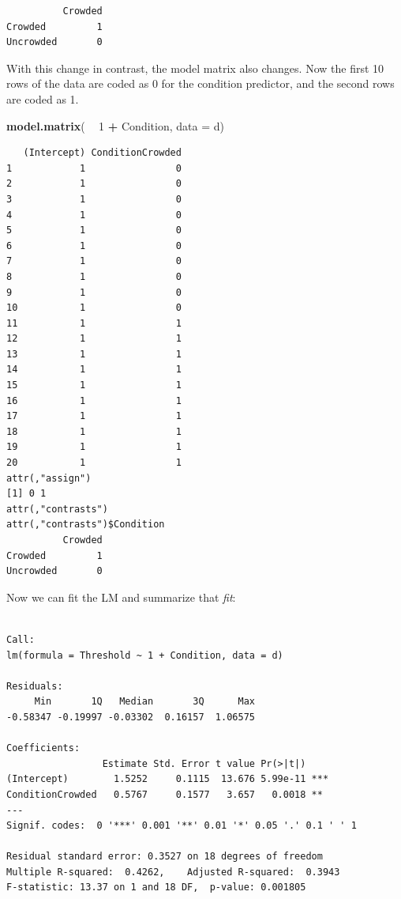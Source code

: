 \documentclass[
]{article}
\newenvironment{Shaded}{\begin{snugshade}}{\end{snugshade}}
\newcommand{\DataTypeTok}[1]{\textcolor[rgb]{0.13,0.29,0.53}{#1}}
\newcommand{\DecValTok}[1]{\textcolor[rgb]{0.00,0.00,0.81}{#1}}
\newcommand{\KeywordTok}[1]{\textcolor[rgb]{0.13,0.29,0.53}{\textbf{#1}}}
\newcommand{\NormalTok}[1]{#1}
\newcommand{\OperatorTok}[1]{\textcolor[rgb]{0.81,0.36,0.00}{\textbf{#1}}}
\newcommand{\StringTok}[1]{\textcolor[rgb]{0.31,0.60,0.02}{#1}}
\begin{document}
\footnotesize

\begin{verbatim}
          Crowded
Crowded         1
Uncrowded       0
\end{verbatim}

\normalsize

With this change in contrast, the model matrix also changes. Now the
first 10 rows of the data are coded as 0 for the condition predictor,
and the second rows are coded as 1.

\footnotesize

\begin{Shaded}
\begin{Highlighting}[]
\KeywordTok{model.matrix}\NormalTok{( }\OperatorTok{~}\StringTok{ }\DecValTok{1} \OperatorTok{+}\StringTok{ }\NormalTok{Condition, }\DataTypeTok{data =}\NormalTok{ d)}
\end{Highlighting}
\end{Shaded}

\begin{verbatim}
   (Intercept) ConditionCrowded
1            1                0
2            1                0
3            1                0
4            1                0
5            1                0
6            1                0
7            1                0
8            1                0
9            1                0
10           1                0
11           1                1
12           1                1
13           1                1
14           1                1
15           1                1
16           1                1
17           1                1
18           1                1
19           1                1
20           1                1
attr(,"assign")
[1] 0 1
attr(,"contrasts")
attr(,"contrasts")$Condition
          Crowded
Crowded         1
Uncrowded       0
\end{verbatim}

\normalsize

Now we can fit the LM and summarize that \emph{fit}:

\footnotesize

\begin{verbatim}

Call:
lm(formula = Threshold ~ 1 + Condition, data = d)

Residuals:
     Min       1Q   Median       3Q      Max 
-0.58347 -0.19997 -0.03302  0.16157  1.06575 

Coefficients:
                 Estimate Std. Error t value Pr(>|t|)    
(Intercept)        1.5252     0.1115  13.676 5.99e-11 ***
ConditionCrowded   0.5767     0.1577   3.657   0.0018 ** 
---
Signif. codes:  0 '***' 0.001 '**' 0.01 '*' 0.05 '.' 0.1 ' ' 1

Residual standard error: 0.3527 on 18 degrees of freedom
Multiple R-squared:  0.4262,    Adjusted R-squared:  0.3943 
F-statistic: 13.37 on 1 and 18 DF,  p-value: 0.001805
\end{verbatim}
\end{document}
